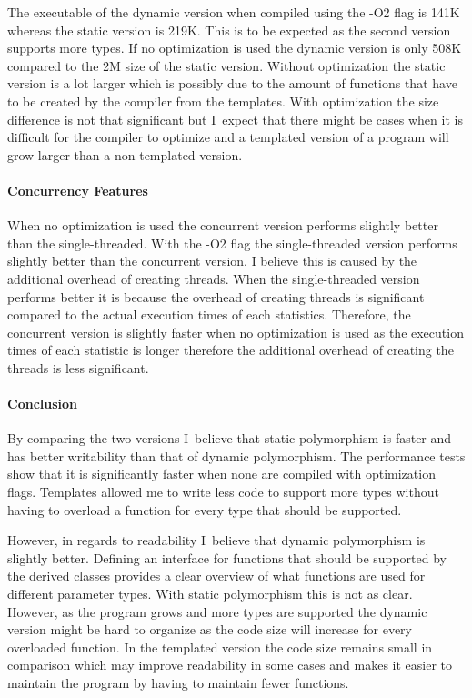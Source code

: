 \documentclass[a4paper]{report}
\begin{document}
The executable of the dynamic version when compiled using the -O2 flag is 141K whereas the static version is 219K. This is to be expected as the second version supports more types. If no optimization is used the dynamic version is only 508K compared to the 2M size of the static version. Without optimization the static version is a lot larger which is possibly due to the amount of functions that have to be created by the compiler from the templates. With optimization the size difference is not that significant but I~expect that there might be cases when it is difficult for the compiler to optimize and a templated version of a program will grow larger than a non-templated version.

\paragraph{Concurrency Features}
When no optimization is used the concurrent version performs slightly better than the single-threaded. With the -O2 flag the single-threaded version performs slightly better than the concurrent version. I believe this is caused by the additional overhead of creating threads. When the single-threaded version performs better it is because the overhead of creating threads is significant compared to the actual execution times of each statistics. Therefore, the concurrent version is slightly faster when no optimization is used as the execution times of each statistic is longer therefore the additional overhead of creating the threads is less significant.

\paragraph{Conclusion}

By comparing the two versions I~believe that static polymorphism is faster and has better writability than that of dynamic polymorphism. The performance tests show that it is significantly faster when none are compiled with optimization flags. Templates allowed me to write less code to support more types without having to overload a function for every type that should be supported.

However, in regards to readability I~believe that dynamic polymorphism is slightly better. Defining an interface for functions that should be supported by the derived classes provides a clear overview of what functions are used for different parameter types. With static polymorphism this is not as clear. However, as the program grows and more types are supported the dynamic version might be hard to organize as the code size will increase for every overloaded function. In the templated version the code size remains small in comparison which may improve readability in some cases and makes it easier to maintain the program by having to maintain fewer functions.
\end{document}
